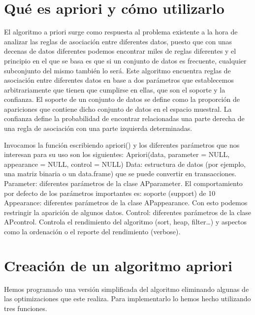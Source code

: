 \documentclass [a4paper] {article}
\begin{document}
\section{Qué es apriori y cómo utilizarlo}
El algoritmo a priori surge como respuesta al problema existente a la hora de analizar las reglas de asociación 
entre diferentes datos, puesto que con unas decenas de datos diferentes podemos encontrar miles de reglas diferentes y el
 principio en el que se basa es que si un conjunto de datos es frecuente, cualquier subconjunto del mismo también lo será. 
Este algoritmo encuentra reglas de asociación entre diferentes datos en base a dos parámetros que establecemos 
arbitrariamente que tienen que cumplirse en ellas, que son el soporte y la confianza. El soporte de un conjunto de datos se 
define como la proporción de apariciones que contiene dicho conjunto de datos en el espacio muestral. La confianza define 
la probabilidad de encontrar relacionadas una parte derecha de una regla de asociación con una parte izquierda determinadas.

\vspace{5mm}

Invocamos la función escribiendo apriori() y los diferentes parámetros que nos interesan para su uso son los siguientes:
Apriori(data, parameter = NULL, appearance = NULL, control = NULL)
Data: estructura de datos (por ejemplo, una matriz binaria o un data.frame) que se puede convertir en transacciones.
Parameter: diferentes parámetros de la clase APparameter. El comportamiento por defecto de los parámetros importantes es: soporte (support) de 10%
Appearance: diferentes parámetros de la clase APappearance. Con esto podemos restringir la aparición de algunos datos.
Control: diferentes parámetros de la clase APcontrol. Controla el rendimiento del algoritmo (sort, heap, filter…) y aspectos como la ordenación o el reporte del rendimiento (verbose).

\section{Creación de un algoritmo apriori}
Hemos programado una versión simplificada del algoritmo eliminando algunas de las optimizaciones que este realiza.
Para implementarlo lo hemos hecho utilizando tres funciones.
\end{document}
